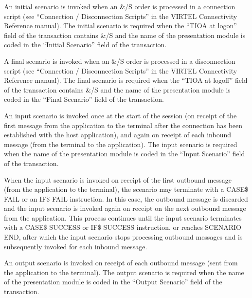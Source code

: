 \documentclass[letterpaper,10pt,english]{sphinxmanual}
\begin{document}

An initial scenario is invoked when an \&/S order is processed in a connection script (see “Connection / Disconnection
Scripts” in the VIRTEL Connectivity Reference manual). The initial scenario is required when the “TIOA at logon” field
of the transaction contains \&/S and the name of the presentation module is coded in the “Initial Scenario” field of the
transaction.


A final scenario is invoked when an \&/S order is processed in a disconnection script (see “Connection / Disconnection
Scripts” in the VIRTEL Connectivity Reference manual). The final scenario is required when the “TIOA at logoff” field of
the transaction contains \&/S and the name of the presentation module is coded in the “Final Scenario” field of the
transaction.


An input scenario is invoked once at the start of the session (on receipt of the first message from the application to the
terminal after the connection has been established with the host application), and again on receipt of each inbound
message (from the terminal to the application). The input scenario is required when the name of the presentation
module is coded in the “Input Scenario” field of the transaction.

When the input scenario is invoked on receipt of the first outbound message (from the application to the terminal),
the scenario may terminate with a CASE\$ FAIL or an IF\$ FAIL instruction. In this case, the outbound message is
discarded and the input scenario is invoked again on receipt on the next outbound message from the application. This
process continues until the input scenario terminates with a CASE\$ SUCCESS or IF\$ SUCCESS instruction, or reaches
SCENARIO END, after which the input scenario stops processing outbound messages and is subsequently invoked for
each inbound message.


An output scenario is invoked on receipt of each outbound message (sent from the application to the terminal). The
output scenario is required when the name of the presentation module is coded in the “Output Scenario” field of the
transaction.

\end{document}
